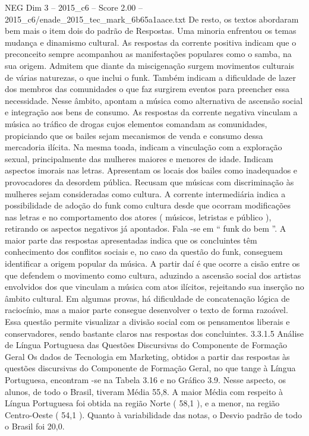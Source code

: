 \begin{textsample}{NEG Dim 3 – 2015\_c6 – Score 2.00 – 2015\_c6/enade\_2015\_tec\_mark\_6b65a1aace.txt}
De resto, os textos abordaram bem mais o item dois do padrão de Respostas.
Uma minoria enfrentou os temas mudança e dinamismo cultural.
As respostas da corrente positiva indicam que o preconceito sempre acompanhou as manifestações populares como o samba, na sua origem.
Admitem que diante da miscigenação surgem movimentos culturais de várias naturezas, o que inclui o funk.
Também indicam a dificuldade de lazer dos membros das comunidades o que faz surgirem eventos para preencher essa necessidade.
Nesse âmbito, apontam a música como alternativa de ascensão social e integração aos bens de consumo.
As respostas da corrente negativa vinculam a música ao tráfico de drogas cujos elementos comandam as comunidades, propiciando que os bailes sejam mecanismos de venda e consumo dessa mercadoria ilícita.
Na mesma toada, indicam a vinculação com a exploração sexual, principalmente das mulheres maiores e menores de idade.
Indicam aspectos imorais nas letras.
Apresentam os locais dos bailes como inadequados e provocadores da desordem pública.
Recusam que músicas com discriminação às mulheres sejam consideradas como cultura.
A corrente intermediária indica a possibilidade de adoção do funk como cultura desde que ocorram modificações nas letras e no comportamento dos atores ( músicos, letristas e público ), retirando os aspectos negativos já apontados.
Fala -se em “ funk do bem ”.
A maior parte das respostas apresentadas indica que os concluintes têm conhecimento dos conflitos sociais e, no caso da questão do funk, conseguem identificar a origem popular da música.
A partir daí é que ocorre a cisão entre os que defendem o movimento como cultura, aduzindo a ascensão social dos artistas envolvidos dos que vinculam a música com atos ilícitos, rejeitando sua inserção no âmbito cultural.
Em algumas provas, há dificuldade de concatenação lógica de raciocínio, mas a maior parte consegue desenvolver o texto de forma razoável.
Essa questão permite visualizar a divisão social com os pensamentos liberais e conservadores, sendo bastante claros nas respostas dos concluintes. 3.3.1.5 Análise de Língua Portuguesa das Questões Discursivas do Componente de Formação Geral Os dados de Tecnologia em Marketing, obtidos a partir das respostas às questões discursivas do Componente de Formação Geral, no que tange à Língua Portuguesa, encontram -se na Tabela 3.16 e no Gráfico 3.9.
Nesse aspecto, os alunos, de todo o Brasil, tiveram Média 55,8.
A maior Média com respeito à Língua Portuguesa foi obtida na região Norte ( 58,1 ), e a menor, na região Centro-Oeste ( 54,1 ).
Quanto à variabilidade das notas, o Desvio padrão de todo o Brasil foi 20,0.

\end{textsample}
